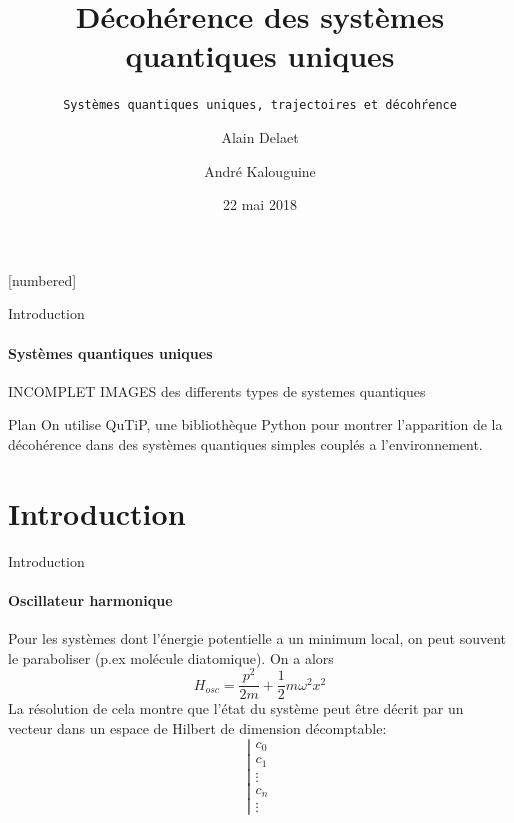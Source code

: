 \documentclass[11pt]{beamer}
\begin{document}
	\author{Alain Delaet \and André Kalouguine}
	\title{Décohérence des systèmes quantiques uniques}
	\subtitle{\texttt{Systèmes quantiques uniques, trajectoires et décohŕence}}
	\date{22 mai 2018}

	[numbered]

	\frame{\maketitle}

\begin{frame}{Introduction}
\framesubtitle{Systèmes quantiques uniques}
INCOMPLET IMAGES des differents types de systemes quantiques
\end{frame}

\begin{frame}{Plan}
On utilise QuTiP, une bibliothèque Python pour montrer l'apparition de la décohérence dans des systèmes quantiques simples couplés a l'environnement.
\tableofcontents
\end{frame}

\section{Introduction}


\begin{frame}{Introduction}
\framesubtitle{Oscillateur harmonique}
Pour les systèmes dont l'énergie potentielle a un minimum local, on peut souvent le paraboliser (p.ex molécule diatomique).
On a alors
\[
H_{osc}=\frac{p^2}{2m}+\frac 12 m\omega^2x^2
\]
La résolution de cela montre que l'état du système peut être décrit par un vecteur dans un espace de Hilbert de dimension décomptable:
\[
\left|\begin{matrix}
c_0 \\ c_1 \\ \vdots \\c_n \\ \vdots
\end{matrix}\right.
\]
\end{frame}
\end{document}
